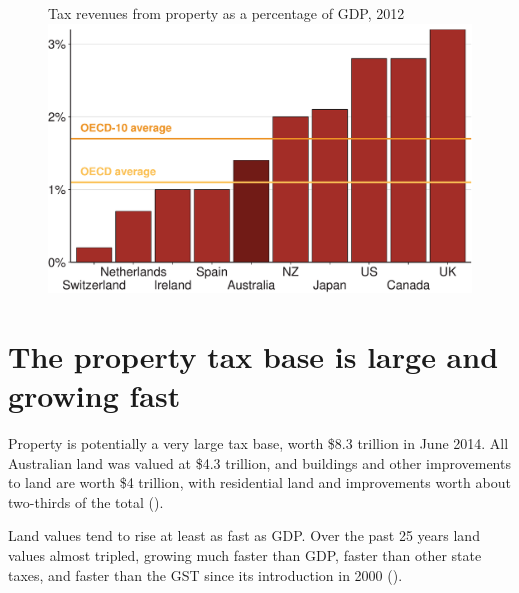 \begin{figure}
%
{Tax revenues from property as a percentage of GDP, 2012}
\includegraphics[width=\columnwidth]{Property-taxes/atlas/figure/Figure1-1.pdf}

\end{figure}

\section{The property tax base is large and growing fast\label{sec:PROP-3-2}}
Property is potentially a very large tax base, worth \$8.3 trillion in June 2014. All Australian land was valued at \$4.3 trillion, and buildings and other improvements to land are worth \$4 trillion, with residential land and improvements worth about two-thirds of the total (). 



Land values tend to rise at least as fast as GDP\@. Over the past 25 years land values almost tripled, growing much faster than GDP, faster than other state taxes, and faster than the GST since its introduction in 2000 ().  

